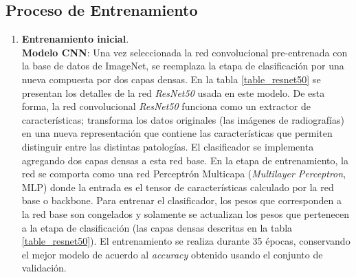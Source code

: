 \subsection{Proceso de Entrenamiento}
\label{ss:archiecture}


\begin{enumerate}
    \item \textbf{Entrenamiento inicial}.\\
        \textbf{Modelo CNN}: Una vez seleccionada la red convolucional pre-entrenada con la base de datos de
        ImageNet, se reemplaza la etapa de clasificación por una nueva compuesta por dos capas densas. En la
        tabla \ref{table_resnet50} se presentan los detalles de la red \textit{ResNet50} usada en este modelo.
        De esta forma, la red convolucional \textit{ResNet50} funciona como un extractor de características;
        transforma los datos originales (las imágenes de radiografías) en una nueva representación que contiene
        las características que permiten distinguir entre las distintas patologías. El clasificador se implementa
        agregando dos capas densas a esta red base. En la etapa de entrenamiento, la red se comporta como una red
        Perceptrón Multicapa (\textit{Multilayer Perceptron}, MLP) donde la entrada es el tensor de características
        calculado por la red base o backbone. Para entrenar el clasificador, los pesos que corresponden a la red
        base son congelados y solamente se actualizan los pesos que pertenecen a la etapa de clasificación (las
        capas densas descritas en la tabla \ref{table_resnet50}). El entrenamiento se realiza durante 35 épocas,
        conservando el mejor modelo de acuerdo al \textit{accuracy} obtenido usando el conjunto de validación.


\end{enumerate}
